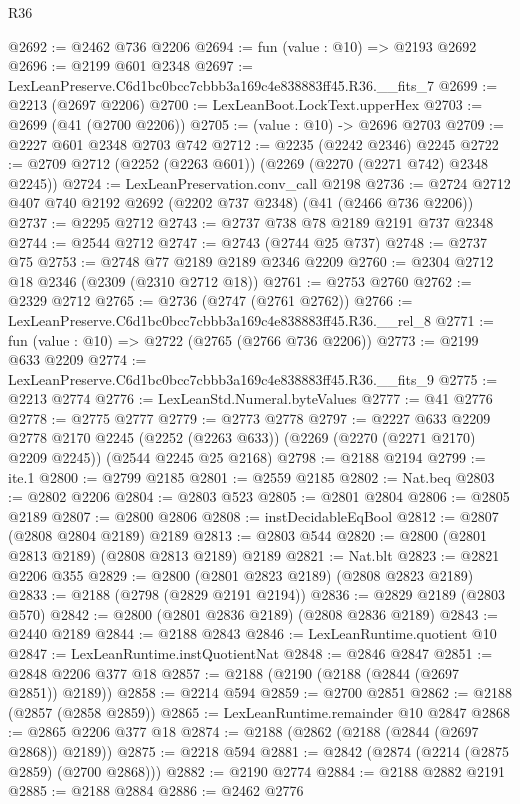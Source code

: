 \begin{lexlean}{R36}
\begin{coremodule}
@2692 := @2462 @736 @2206
@2694 := fun (value : @10) => @2193 @2692
@2696 := @2199 @601 @2348
@2697 := LexLeanPreserve.C6d1bc0bcc7cbbb3a169c4e838883ff45.R36.__fits_7
@2699 := @2213 (@2697 @2206)
@2700 := LexLeanBoot.LockText.upperHex
@2703 := @2699 (@41 (@2700 @2206))
@2705 := (value : @10) -> @2696 @2703
@2709 := @2227 @601 @2348 @2703 @742
@2712 := @2235 (@2242 @2346) @2245
@2722 := @2709 @2712 (@2252 (@2263 @601)) (@2269 (@2270 (@2271 @742) @2348 @2245))
@2724 := LexLeanPreservation.conv_call @2198
@2736 := @2724 @2712 @407 @740 @2192 @2692 (@2202 @737 @2348) (@41 (@2466 @736 @2206))
@2737 := @2295 @2712
@2743 := @2737 @738 @78 @2189 @2191 @737 @2348
@2744 := @2544 @2712
@2747 := @2743 (@2744 @25 @737)
@2748 := @2737 @75
@2753 := @2748 @77 @2189 @2189 @2346 @2209
@2760 := @2304 @2712 @18 @2346 (@2309 (@2310 @2712 @18))
@2761 := @2753 @2760
@2762 := @2329 @2712
@2765 := @2736 (@2747 (@2761 @2762))
@2766 := LexLeanPreserve.C6d1bc0bcc7cbbb3a169c4e838883ff45.R36.__rel_8
@2771 := fun (value : @10) => @2722 (@2765 (@2766 @736 @2206))
@2773 := @2199 @633 @2209
@2774 := LexLeanPreserve.C6d1bc0bcc7cbbb3a169c4e838883ff45.R36.__fits_9
@2775 := @2213 @2774
@2776 := LexLeanStd.Numeral.byteValues
@2777 := @41 @2776
@2778 := @2775 @2777
@2779 := @2773 @2778
@2797 := @2227
    @633
    @2209
    @2778
    @2170
    @2245
    (@2252 (@2263 @633))
    (@2269 (@2270 (@2271 @2170) @2209 @2245))
    (@2544 @2245 @25 @2168)
@2798 := @2188 @2194
@2799 := ite.{1}
@2800 := @2799 @2185
@2801 := @2559 @2185
@2802 := Nat.beq
@2803 := @2802 @2206
@2804 := @2803 @523
@2805 := @2801 @2804
@2806 := @2805 @2189
@2807 := @2800 @2806
@2808 := instDecidableEqBool
@2812 := @2807 (@2808 @2804 @2189) @2189
@2813 := @2803 @544
@2820 := @2800 (@2801 @2813 @2189) (@2808 @2813 @2189) @2189
@2821 := Nat.blt
@2823 := @2821 @2206 @355
@2829 := @2800 (@2801 @2823 @2189) (@2808 @2823 @2189)
@2833 := @2188 (@2798 (@2829 @2191 @2194))
@2836 := @2829 @2189 (@2803 @570)
@2842 := @2800 (@2801 @2836 @2189) (@2808 @2836 @2189)
@2843 := @2440 @2189
@2844 := @2188 @2843
@2846 := LexLeanRuntime.quotient @10
@2847 := LexLeanRuntime.instQuotientNat
@2848 := @2846 @2847
@2851 := @2848 @2206 @377 @18
@2857 := @2188 (@2190 (@2188 (@2844 (@2697 @2851)) @2189))
@2858 := @2214 @594
@2859 := @2700 @2851
@2862 := @2188 (@2857 (@2858 @2859))
@2865 := LexLeanRuntime.remainder @10 @2847
@2868 := @2865 @2206 @377 @18
@2874 := @2188 (@2862 (@2188 (@2844 (@2697 @2868)) @2189))
@2875 := @2218 @594
@2881 := @2842 (@2874 (@2214 (@2875 @2859) (@2700 @2868)))
@2882 := @2190 @2774
@2884 := @2188 @2882 @2191
@2885 := @2188 @2884
@2886 := @2462 @2776

\end{coremodule}
\end{lexlean}
